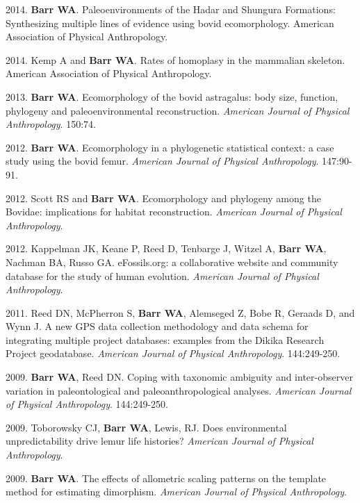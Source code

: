 \documentclass{article}
\begin{document}
\begin{etaremune}
\item 2014. {\bfseries Barr WA}. Paleoenvironments of the Hadar and Shungura Formations: Synthesizing multiple lines of evidence using bovid ecomorphology. American Association of Physical Anthropology.

\item 2014. Kemp A and {\bfseries Barr WA}. Rates of homoplasy in the mammalian skeleton. American Association of Physical Anthropology.


\item 2013. {\bfseries Barr WA}. Ecomorphology of the bovid astragalus: body size, function, phylogeny and paleoenvironmental reconstruction. \emph{American Journal of Physical Anthropology}. 150:74.


\item 2012. {\bfseries Barr WA}. Ecomorphology in a phylogenetic statistical context: a case study using the bovid femur. \emph{American Journal of Physical Anthropology}. 147:90-91.

\item 2012. Scott RS and {\bfseries Barr WA}. Ecomorphology and phylogeny among the Bovidae: implications for habitat reconstruction. \emph{American Journal of Physical Anthropology}.

\item 2012. Kappelman JK, Keane P, Reed D, Tenbarge J, Witzel A, {\bfseries Barr WA}, Nachman BA, Russo GA. eFossils.org: a collaborative website and community database for the study of human evolution. \emph{American Journal of Physical Anthropology}.


\item 2011. Reed DN, McPherron S, {\bfseries Barr WA}, Alemseged Z, Bobe R, Geraads D, and Wynn J. A new GPS data collection methodology and data schema for integrating multiple project databases: examples from the Dikika Research Project geodatabase. \emph{American Journal of Physical Anthropology}. 144:249-250.


\item 2009. {\bfseries Barr WA}, Reed DN. Coping with taxonomic ambiguity and inter-observer variation in paleontological and paleoanthropological analyses. \emph{American Journal of Physical Anthropology}. 144:249-250.


\item 2009. Toborowsky CJ, {\bfseries Barr WA}, Lewis, RJ. Does environmental unpredictability drive lemur life histories? \emph{American Journal of Physical Anthropology}.


\item 2009. {\bfseries Barr WA}. The effects of allometric scaling patterns on the template method for estimating dimorphism. \emph{American Journal of Physical Anthropology}.


\end{etaremune}
\end{document}
